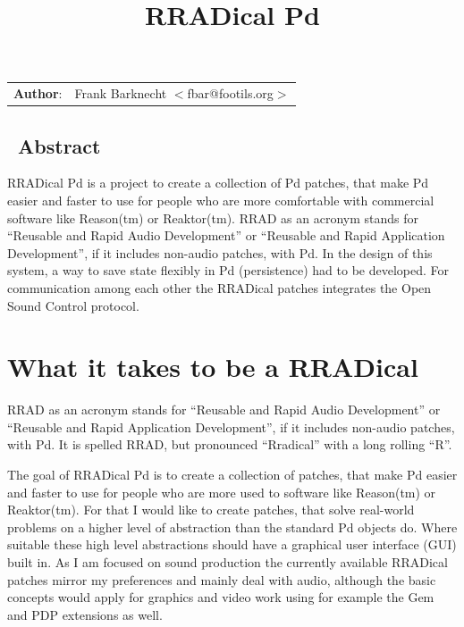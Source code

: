 \documentclass[10pt,english]{scrartcl}
\title{RRADical Pd}
\author{}
\date{}
\newlength{\docinfowidth}
\begin{document}
\maketitle

\begin{center}
\begin{tabularx}{\docinfowidth}{lX}
\textbf{Author}: &
	Frank Barknecht {$<$}fbar@footils.org{$>$} \\
\end{tabularx}
\end{center}
\subsection*{~\hfill Abstract\hfill ~}

RRADical Pd is a project to create a collection of Pd patches, that make
Pd easier and faster to use for people who are more comfortable with
commercial software like Reason(tm) or Reaktor(tm).  RRAD as an acronym
stands for ``Reusable and Rapid Audio Development'' or ``Reusable and Rapid
Application Development'', if it includes non-audio patches, with Pd. In
the design of this system, a way to save state flexibly in Pd
(persistence) had to be developed. For communication among each other
the RRADical patches integrates the Open Sound Control protocol.




\hypertarget{what-it-takes-to-be-a-rradical}{}
\section*{What it takes to be a RRADical}

RRAD as an acronym stands for ``Reusable and Rapid Audio Development'' or
``Reusable and Rapid Application Development'', if it includes non-audio
patches, with Pd. It is spelled RRAD, but pronounced ``Rradical'' with a
long rolling ``R''.

The goal of RRADical Pd is to create a collection of patches, that make Pd
easier and faster to use for people who are more used to software like
Reason(tm) or Reaktor(tm). For that I would like to create patches, that
solve real-world problems on a higher level of abstraction than the standard
Pd objects do.  Where suitable these high level abstractions should have a
graphical user interface (GUI) built in. As I am focused on sound production
the currently available RRADical patches mirror my preferences and mainly
deal with audio, although the basic concepts would apply for graphics and
video work using for example the Gem and PDP extensions as well.
\end{document}
